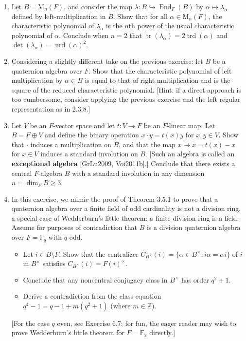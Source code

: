 \documentclass{article}
\theoremstyle{definition}
\begin{document}
\begin{enumerate}
\item[\textbf{13.}] Let $B = \mathrm{M}_n(F)$, and consider the map $\lambda: B \hookrightarrow \operatorname{End}_F(B)$ by $\alpha \mapsto \lambda_\alpha$ defined by left-multiplication in $B$. Show that for all $\alpha \in \mathrm{M}_n(F)$, the characteristic polynomial of $\lambda_\alpha$ is the $n$th power of the usual characteristic polynomial of $\alpha$. Conclude when $n = 2$ that $\operatorname{tr}(\lambda_\alpha) = 2 \operatorname{trd}(\alpha)$ and $\det(\lambda_\alpha) = \operatorname{nrd}(\alpha)^2$.

\item[14.] Considering a slightly different take on the previous exercise: let $B$ be a quaternion algebra over $F$. Show that the characteristic polynomial of left multiplication by $\alpha \in B$ is equal to that of right multiplication and is the square of the reduced characteristic polynomial. [Hint: if a direct approach is too cumbersome, consider applying the previous exercise and the left regular representation as in 2.3.8.]

\item[15.] Let $V$ be an $F$-vector space and let $t: V \to F$ be an $F$-linear map. Let $B = F \oplus V$ and define the binary operation $x \cdot y = t(x)y$ for $x, y \in V$. Show that $\cdot$ induces a multiplication on $B$, and that the map $x \mapsto \overline{x} = t(x) - x$ for $x \in V$ induces a standard involution on $B$. [Such an algebra is called an \textbf{exceptional algebra} [GrLu2009, Voi2011b].] Conclude that there exists a central $F$-algebra $B$ with a standard involution in any dimension $n = \dim_F B \geq 3$.

\item[\textbf{16.}] In this exercise, we mimic the proof of Theorem 3.5.1 to prove that a quaternion algebra over a finite field of odd cardinality is not a division ring, a special case of Wedderburn's little theorem: a finite division ring is a field. Assume for purposes of contradiction that $B$ is a division quaternion algebra over $F = \mathbb{F}_q$ with $q$ odd.
\begin{itemize}
  \item[(a)] Let $i \in B \setminus F$. Show that the centralizer $C_{B^\times}(i) = \{\alpha \in B^\times : i\alpha = \alpha i\}$ of $i$ in $B^\times$ satisfies $C_{B^\times}(i) = F(i)^\times$.
  \item[(b)] Conclude that any noncentral conjugacy class in $B^\times$ has order $q^2 + 1$.
  \item[(c)] Derive a contradiction from the class equation $q^4 - 1 = q - 1 + m(q^2 + 1)$ (where $m \in \mathbb{Z}$).
\end{itemize}
[For the case $q$ even, see Exercise 6.7; for fun, the eager reader may wish to prove Wedderburn's little theorem for $F = \mathbb{F}_2$ directly.]


\end{enumerate}
\end{document}
